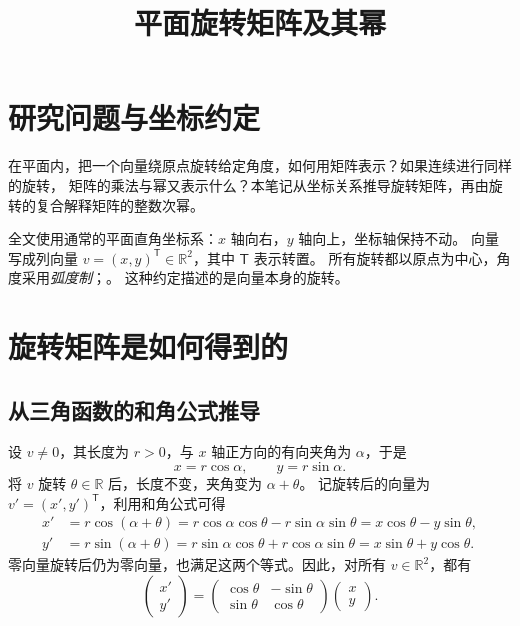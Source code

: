 \documentclass[UTF8,12pt,a4paper,fontset=fandol]{ctexart}
\title{平面旋转矩阵及其幂}
\author{}
\date{}
\begin{document}
\maketitle


\section{研究问题与坐标约定}
在平面内，把一个向量绕原点旋转给定角度，如何用矩阵表示？如果连续进行同样的旋转，
矩阵的乘法与幂又表示什么？本笔记从坐标关系推导旋转矩阵，再由旋转的复合解释矩阵的整数次幂。


全文使用通常的平面直角坐标系：$x$ 轴向右，$y$ 轴向上，坐标轴保持不动。
向量写成列向量 $v=(x,y)^{\mathsf T}\in\mathbb R^2$，其中 $\mathsf T$ 表示转置。
所有旋转都以原点为中心，角度采用\emph{弧度制}；。
这种约定描述的是向量本身的旋转。


\section{旋转矩阵是如何得到的}
\subsection{从三角函数的和角公式推导}
设 $v\ne0$，其长度为 $r>0$，与 $x$ 轴正方向的有向夹角为 $\alpha$，于是
\[
  x=r\cos\alpha,\qquad y=r\sin\alpha.
\]
将 $v$ 旋转 $\theta\in\mathbb R$ 后，长度不变，夹角变为 $\alpha+\theta$。
记旋转后的向量为 $v'=(x',y')^{\mathsf T}$，利用和角公式可得
\begin{align*}
  x'&=r\cos(\alpha+\theta)
     =r\cos\alpha\cos\theta-r\sin\alpha\sin\theta
     =x\cos\theta-y\sin\theta,\\
  y'&=r\sin(\alpha+\theta)
     =r\sin\alpha\cos\theta+r\cos\alpha\sin\theta
     =x\sin\theta+y\cos\theta.
\end{align*}
零向量旋转后仍为零向量，也满足这两个等式。因此，对所有 $v\in\mathbb R^2$，都有
\begin{equation}
  \begin{pmatrix}x'\\y'\end{pmatrix}
  =\begin{pmatrix}
    \cos\theta&-\sin\theta\\
    \sin\theta&\cos\theta
  \end{pmatrix}
  \begin{pmatrix}x\\y\end{pmatrix}.
  \label{eq:rotation-coordinate}
\end{equation}
\end{document}
